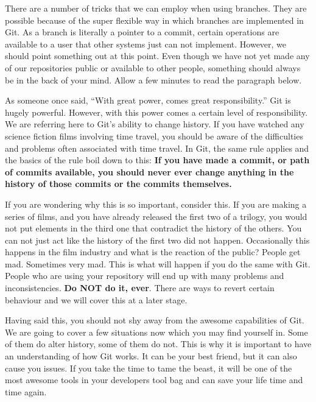 There are a number of tricks that we can employ when using branches.  They are possible because of the super flexible way in which branches are implemented in Git.  As a branch is literally a pointer to a commit, certain operations are available to a user that other systems just can not implement.  However, we should point something out at this point.  Even though we have not yet made any of our repositories public or available to other people, something should always be in the back of your mind.  Allow a few minutes to read the paragraph below.

As someone once said, ``With great power, comes great responsibility.''  Git is hugely powerful.  However, with this power comes a certain level of responsibility.  We are referring here to Git's ability to change history.  If you have watched any science fiction films involving time travel, you should be aware of the difficulties and problems often associated with time travel.  In Git, the same rule applies and the basics of the rule boil down to this: \textbf{If you have made a commit, or path of commits available, you should never ever change anything in the history of those commits or the commits themselves.}  

If you are wondering why this is so important, consider this.  If you are making a series of films, and you have already released the first two of a trilogy, you would not put elements in the third one that contradict the history of the others.  You can not just act like the history of the first two did not happen.  Occasionally this happens in the film industry and what is the reaction of the public?  People get mad.  Sometimes very mad.  This is what will happen if you do the same with Git.  People who are using your repository will end up with many problems and inconsistencies.  \textbf{Do NOT do it, ever}.  There are ways to revert certain behaviour and we will cover this at a later stage.

Having said this, you should not shy away from the awesome capabilities of Git.  We are going to cover a few situations now which you may find yourself in.  Some of them do alter history, some of them do not.  This is why it is important to have an understanding of how Git works.  It can be your best friend, but it can also cause you issues.  If you take the time to tame the beast, it will be one of the most awesome tools in your developers tool bag and can save your life time and time again.  

